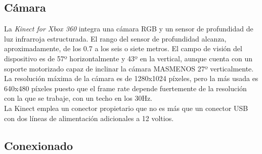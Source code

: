 \subsection{Cámara}
La \textit{Kinect for Xbox 360} integra una cámara RGB y un sensor de profundidad de luz infrarroja estructurada. El rango del sensor de profundidad alcanza, aproximadamente, de los 0.7 a los seis o siete metros. El campo de visión del dispositivo es de 57º horizontalmente y 43º en la vertical, aunque cuenta con un soporte motorizado capaz de inclinar la cámara MASMENOS 27º verticalmente. La resolución máxima de la cámara es de 1280x1024 píxeles, pero la más usada es 640x480 píxeles puesto que el frame rate depende fuertemente de la resolución con la que se trabaje, con un techo en los 30Hz.\\
La Kinect emplea un conector propietario que no es más que un conector USB con dos líneas de alimentación adicionales a 12 voltios.  
\subsection{Conexionado}